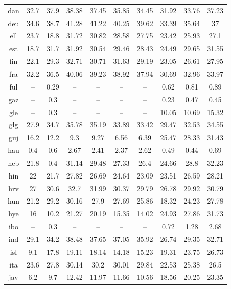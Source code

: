 \begin{table}[htb]
\begin{tabular}{@{}cccccccccc@{}}
        dan & 32.7 & 37.9 & 38.38 & 37.45 & 35.85 & 34.45 & 31.92 & 33.76 & 37.23 \\
        deu & 34.6 & 38.7 & 41.28 & 41.22 & 40.25 & 39.62 & 33.39 & 35.64 & 37 \\
        ell & 23.7 & 18.8 & 31.72 & 30.82 & 28.58 & 27.75 & 23.42 & 25.93 & 27.1 \\
        est & 18.7 & 31.7 & 31.92 & 30.54 & 29.46 & 28.43 & 24.49 & 29.65 & 31.55 \\
        fin & 22.1 & 29.3 & 32.71 & 30.71 & 31.63 & 29.19 & 23.05 & 26.61 & 27.95 \\
        fra & 32.2 & 36.5 & 40.06 & 39.23 & 38.92 & 37.94 & 30.69 & 32.96 & 33.97 \\
        ful & -- & 0.29 & -- & -- & -- & -- & 0.62 & 0.81 & 0.89 \\
        gaz & -- & 0.3 & -- & -- & -- & -- & 0.23 & 0.47 & 0.45 \\
        gle & -- & 0.3 & -- & -- & -- & -- & 10.05 & 10.69 & 15.32 \\
        glg & 27.9 & 34.7 & 35.78 & 35.19 & 33.89 & 33.42 & 29.47 & 32.53 & 34.55 \\
        guj & 16.2 & 12.2 & 9.3 & 9.27 & 6.56 & 6.39 & 25.47 & 28.33 & 31.43 \\
        hau & 0.4 & 0.6 & 2.67 & 2.41 & 2.37 & 2.62 & 0.49 & 0.44 & 0.69 \\
        heb & 21.8 & 0.4 & 31.14 & 29.48 & 27.33 & 26.4 & 24.66 & 28.8 & 32.23 \\
        hin & 22 & 21.7 & 27.82 & 26.69 & 24.64 & 23.09 & 23.51 & 26.59 & 28.21 \\
        hrv & 27 & 30.6 & 32.7 & 31.99 & 30.37 & 29.79 & 26.78 & 29.92 & 30.79 \\
        hun & 21.2 & 29.2 & 30.16 & 27.9 & 27.69 & 25.86 & 18.32 & 24.23 & 27.78 \\
        hye & 16 & 10.2 & 21.27 & 20.19 & 15.35 & 14.02 & 24.93 & 27.86 & 31.73 \\
        ibo & -- & 0.3 & -- & -- & -- & -- & 0.72 & 1.28 & 2.68 \\
        ind & 29.1 & 34.2 & 38.48 & 37.65 & 37.05 & 35.92 & 26.74 & 29.35 & 32.71 \\
        isl & 9.1 & 17.8 & 19.11 & 18.14 & 14.18 & 15.23 & 19.31 & 23.75 & 26.73 \\
        ita & 23.6 & 27.8 & 30.14 & 30.2 & 30.01 & 29.84 & 22.53 & 25.38 & 26.5 \\
        jav & 6.2 & 9.7 & 12.42 & 11.97 & 11.66 & 10.56 & 18.56 & 20.25 & 23.35 \\

\end{tabular}
\end{table}
